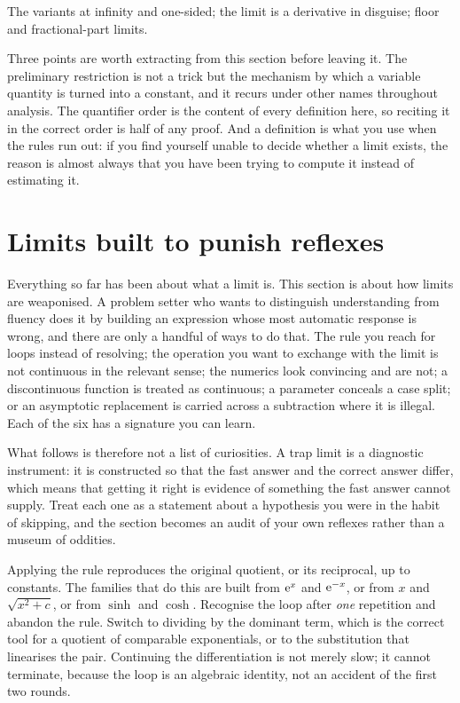 \begin{seealsob}The variants at infinity and one-sided; the limit is a derivative in disguise; floor and fractional-part limits.\end{seealsob}

Three points are worth extracting from this section before leaving it. The preliminary restriction is not a trick but the mechanism by which a variable quantity is turned into a constant, and it recurs under other names throughout analysis. The quantifier order is the content of every definition here, so reciting it in the correct order is half of any proof. And a definition is what you use when the rules run out: if you find yourself unable to decide whether a limit exists, the reason is almost always that you have been trying to compute it instead of estimating it.

\section{Limits built to punish reflexes}

Everything so far has been about what a limit is. This section is about how limits are weaponised. A problem setter who wants to distinguish understanding from fluency does it by building an expression whose most automatic response is wrong, and there are only a handful of ways to do that. The rule you reach for loops instead of resolving; the operation you want to exchange with the limit is not continuous in the relevant sense; the numerics look convincing and are not; a discontinuous function is treated as continuous; a parameter conceals a case split; or an asymptotic replacement is carried across a subtraction where it is illegal. Each of the six has a signature you can learn.

What follows is therefore not a list of curiosities. A trap limit is a diagnostic instrument: it is constructed so that the fast answer and the correct answer differ, which means that getting it right is evidence of something the fast answer cannot supply. Treat each one as a statement about a hypothesis you were in the habit of skipping, and the section becomes an audit of your own reflexes rather than a museum of oddities.

\cue Applying the rule reproduces the original quotient, or its reciprocal, up to constants. The families that do this are built from $\mathrm{e}^{x}$ and $\mathrm{e}^{-x}$, or from $x$ and $\sqrt{x^{2}+c}$, or from $\sinh$ and $\cosh$.
\method Recognise the loop after \emph{one} repetition and abandon the rule. Switch to dividing by the dominant term, which is the correct tool for a quotient of comparable exponentials, or to the substitution that linearises the pair. Continuing the differentiation is not merely slow; it cannot terminate, because the loop is an algebraic identity, not an accident of the first two rounds.

